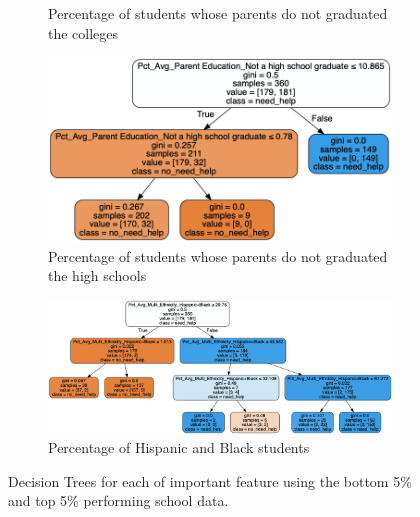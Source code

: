 \documentclass[11pt]{article}
\begin{document}
\begin{figure}[h!]
\begin{subfigure}{0.45\textwidth}
         \caption{Percentage of students whose parents do not graduated the colleges}
         \label{fig:dtree_specific_nocollege}
\end{subfigure}
\hfill
\begin{subfigure}{0.5\textwidth}
         \centering
         \includegraphics[width=\textwidth]{recom_edu_nothigh.png}
         \caption{Percentage of students whose parents do not graduated the high schools}
         \label{fig:dtree_specific_noghigh}
\end{subfigure}
\hfill
\begin{subfigure}{0.7\textwidth}
         \centering
         \includegraphics[width=\textwidth]{recom_hispanic.png}
         \caption{Percentage of Hispanic and Black students}
         \label{fig:dtree_specific_hispanic}
\end{subfigure}
\caption{Decision Trees for each of important feature using the bottom 5\% and top 5\% performing school data.}
\label{fig:dtree_specific_features}
\end{figure}
\end{document}

